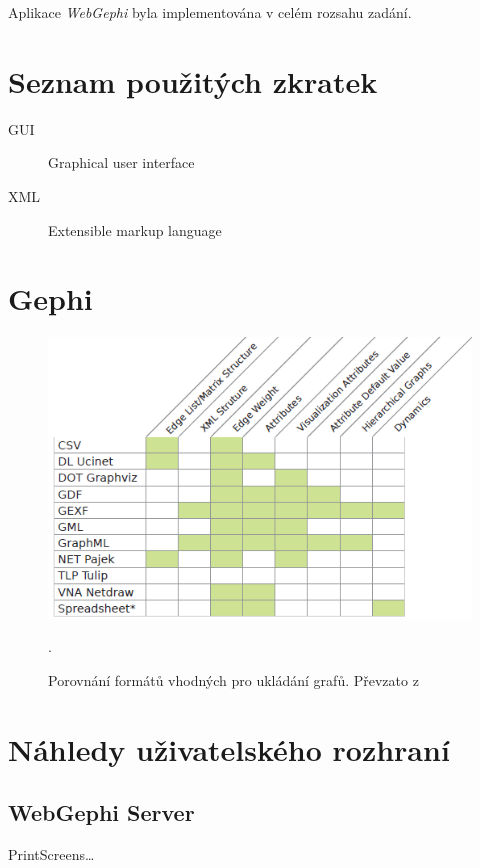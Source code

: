 \documentclass[thesis=M,czech]{FITthesis}[2014/05/6]
\begin{document}
\begin{conclusion}
	Aplikace \textit{WebGephi} byla implementována v celém rozsahu zadání.
\end{conclusion}




\appendix
\chapter{Seznam použitých zkratek}
\begin{description}
	\item[GUI] Graphical user interface
	\item[XML] Extensible markup language
\end{description}

\chapter{Gephi}
\begin{figure}\centering
 	\includegraphics[width=1\textwidth]{images/gephi/graph-format-table-comparison}
 	\caption[Porovnání formátů vhodných pro ukládání grafů]{Porovnání formátů vhodných pro ukládání grafů. Převzato z \cite{gephi}}.\label{fig:gephi-formats-comparation}
\end{figure}

\chapter{Náhledy uživatelského rozhraní}
\section{WebGephi Server}
PrintScreens\ldots
\end{document}
